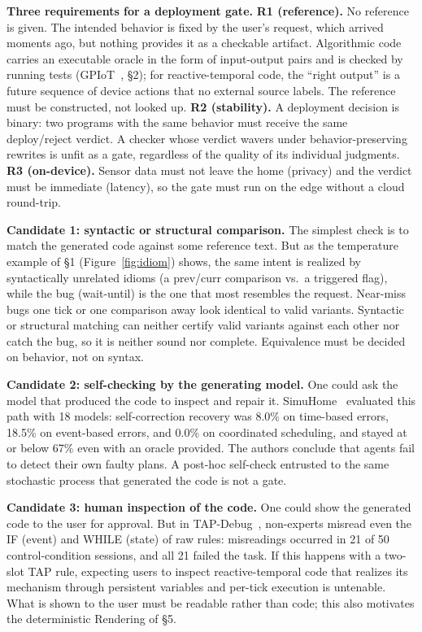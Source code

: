 \documentclass[sigconf,nonacm,anonymous,review]{acmart}
\begin{document}
\textbf{Three requirements for a deployment gate.} \textbf{R1 (reference).} No reference is given. The intended behavior is fixed by the user's request, which arrived moments ago, but nothing provides it as a checkable artifact. Algorithmic code carries an executable oracle in the form of input-output pairs and is checked by running tests (GPIoT~\cite{gpiot}, \S2); for reactive-temporal code, the ``right output'' is a future sequence of device actions that no external source labels. The reference must be constructed, not looked up. \textbf{R2 (stability).} A deployment decision is binary: two programs with the same behavior must receive the same deploy/reject verdict. A checker whose verdict wavers under behavior-preserving rewrites is unfit as a gate, regardless of the quality of its individual judgments. \textbf{R3 (on-device).} Sensor data must not leave the home (privacy) and the verdict must be immediate (latency), so the gate must run on the edge without a cloud round-trip.

\textbf{Candidate 1: syntactic or structural comparison.} The simplest check is to match the generated code against some reference text. But as the temperature example of \S1 (Figure~\ref{fig:idiom}) shows, the same intent is realized by syntactically unrelated idioms (a prev/curr comparison vs.\ a triggered flag), while the bug (wait-until) is the one that most resembles the request. Near-miss bugs one tick or one comparison away look identical to valid variants. Syntactic or structural matching can neither certify valid variants against each other nor catch the bug, so it is neither sound nor complete. Equivalence must be decided on behavior, not on syntax.

\textbf{Candidate 2: self-checking by the generating model.} One could ask the model that produced the code to inspect and repair it. SimuHome~\cite{simuhome} evaluated this path with 18 models: self-correction recovery was 8.0\% on time-based errors, 18.5\% on event-based errors, and 0.0\% on coordinated scheduling, and stayed at or below 67\% even with an oracle provided. The authors conclude that agents fail to detect their own faulty plans. A post-hoc self-check entrusted to the same stochastic process that generated the code is not a gate.

\textbf{Candidate 3: human inspection of the code.} One could show the generated code to the user for approval. But in TAP-Debug~\cite{tapdebug}, non-experts misread even the IF (event) and WHILE (state) of raw rules: misreadings occurred in 21 of 50 control-condition sessions, and all 21 failed the task. If this happens with a two-slot TAP rule, expecting users to inspect reactive-temporal code that realizes its mechanism through persistent variables and per-tick execution is untenable. What is shown to the user must be readable rather than code; this also motivates the deterministic Rendering of \S5.
\end{document}
